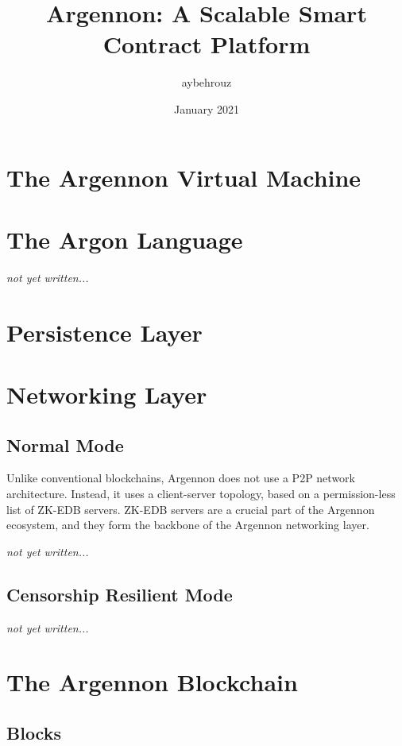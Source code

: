 \documentclass[11pt, a4paper]{report}
\title{Argennon: A Scalable Smart Contract Platform}
\author{aybehrouz}
\date{January 2021}
\newcommand{\note}[1] {
    \begin{tcolorbox}[colframe=white,colback=white]
        \emph{#1}
    \end{tcolorbox}
}
\begin{document}
    \tableofcontents


    \chapter{The Argennon Virtual Machine}\label{ch:AVM}
    


    \chapter{The Argon Language}\label{ch:argon-lang}
    \note{not yet written...}



    \chapter{Persistence Layer}\label{ch:persistance}
    


    \chapter{Networking Layer}\label{ch:networking}
    \section{Normal Mode}\label{sec:normal-mode}
    Unlike conventional blockchains, Argennon does not use a P2P network architecture. Instead, it uses a
    client-server topology, based on a permission-less list of ZK-EDB servers. ZK-EDB servers are a
    crucial part of the Argennon ecosystem, and they form the backbone of the Argennon networking layer.
    \note{not yet written...}


    \section{Censorship Resilient Mode}\label{sec:cens-res-mode}
    \note{not yet written...}


    \chapter{The Argennon Blockchain}\label{ch:argennon-blockchain}
    


    \section{Blocks}\label{sec:blocks}
    
\end{document}
